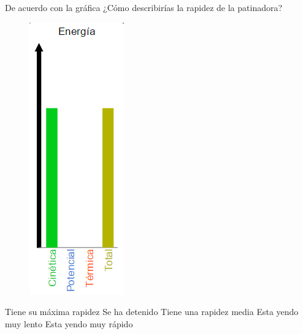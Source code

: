 De acuerdo con la gráfica ¿Cómo describirías la rapidez de la patinadora?

\begin{minipage}{0.3\textwidth}
    \begin{figure}[H]
        \includegraphics[width=0.3\linewidth]{../images/q028h}
    \end{figure}
\end{minipage}\hfill
\begin{minipage}{0.6\textwidth}
    \begin{choices}
        \choice Tiene su máxima rapidez
        \choice Se ha detenido
        \choice Tiene una rapidez media
        \choice Esta yendo muy lento
        \choice Esta yendo muy rápido
    \end{choices}
\end{minipage}

